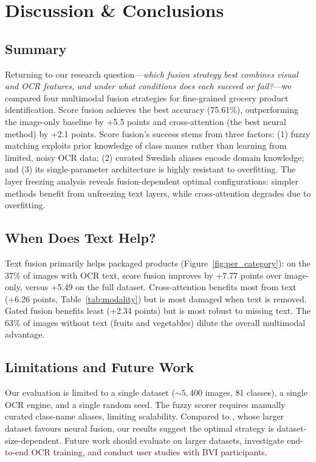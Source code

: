 \documentclass{article}
\begin{document}
\section{Discussion \& Conclusions}
\label{sec:conclusion}

\subsection{Summary}

Returning to our research question---\emph{which fusion strategy best combines visual and OCR features, and under what conditions does each succeed or fail?}---we compared four multimodal fusion strategies for fine-grained grocery product identification. Score fusion achieves the best accuracy (75.61\%), outperforming the image-only baseline by +5.5 points and cross-attention (the best neural method) by +2.1 points. Score fusion's success stems from three factors: (1) fuzzy matching exploits prior knowledge of class names rather than learning from limited, noisy OCR data; (2) curated Swedish aliases encode domain knowledge; and (3) its single-parameter architecture is highly resistant to overfitting. The layer freezing analysis reveals fusion-dependent optimal configurations: simpler methods benefit from unfreezing text layers, while cross-attention degrades due to overfitting.

\subsection{When Does Text Help?}

Text fusion primarily helps packaged products (Figure~\ref{fig:per_category}): on the 37\% of images with OCR text, score fusion improves by +7.77 points over image-only, versus +5.49 on the full dataset. Cross-attention benefits most from text (+6.26 points, Table~\ref{tab:modality}) but is most damaged when text is removed. Gated fusion benefits least (+2.34 points) but is most robust to missing text. The 63\% of images without text (fruits and vegetables) dilute the overall multimodal advantage.

\subsection{Limitations and Future Work}

Our evaluation is limited to a single dataset (${\sim}5,400$ images, 81 classes), a single OCR engine, and a single random seed. The fuzzy scorer requires manually curated class-name aliases, limiting scalability. Compared to \citet{pettersson2024multimodal}, whose larger dataset favours neural fusion, our results suggest the optimal strategy is dataset-size-dependent. Future work should evaluate on larger datasets, investigate end-to-end OCR training, and conduct user studies with BVI participants.




\end{document}

